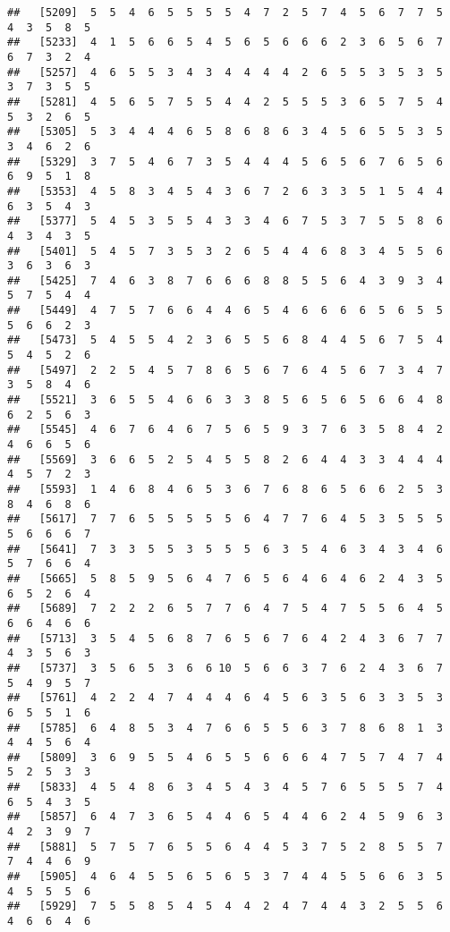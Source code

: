 \documentclass[
]{book}
\begin{document}
\begin{verbatim}
##   [5209]  5  5  4  6  5  5  5  5  4  7  2  5  7  4  5  6  7  7  5  4  3  5  8  5
##   [5233]  4  1  5  6  6  5  4  5  6  5  6  6  6  2  3  6  5  6  7  6  7  3  2  4
##   [5257]  4  6  5  5  3  4  3  4  4  4  4  2  6  5  5  3  5  3  5  3  7  3  5  5
##   [5281]  4  5  6  5  7  5  5  4  4  2  5  5  5  3  6  5  7  5  4  5  3  2  6  5
##   [5305]  5  3  4  4  4  6  5  8  6  8  6  3  4  5  6  5  5  3  5  3  4  6  2  6
##   [5329]  3  7  5  4  6  7  3  5  4  4  4  5  6  5  6  7  6  5  6  6  9  5  1  8
##   [5353]  4  5  8  3  4  5  4  3  6  7  2  6  3  3  5  1  5  4  4  6  3  5  4  3
##   [5377]  5  4  5  3  5  5  4  3  3  4  6  7  5  3  7  5  5  8  6  4  3  4  3  5
##   [5401]  5  4  5  7  3  5  3  2  6  5  4  4  6  8  3  4  5  5  6  3  6  3  6  3
##   [5425]  7  4  6  3  8  7  6  6  6  8  8  5  5  6  4  3  9  3  4  5  7  5  4  4
##   [5449]  4  7  5  7  6  6  4  4  6  5  4  6  6  6  6  5  6  5  5  5  6  6  2  3
##   [5473]  5  4  5  5  4  2  3  6  5  5  6  8  4  4  5  6  7  5  4  5  4  5  2  6
##   [5497]  2  2  5  4  5  7  8  6  5  6  7  6  4  5  6  7  3  4  7  3  5  8  4  6
##   [5521]  3  6  5  5  4  6  6  3  3  8  5  6  5  6  5  6  6  4  8  6  2  5  6  3
##   [5545]  4  6  7  6  4  6  7  5  6  5  9  3  7  6  3  5  8  4  2  4  6  6  5  6
##   [5569]  3  6  6  5  2  5  4  5  5  8  2  6  4  4  3  3  4  4  4  4  5  7  2  3
##   [5593]  1  4  6  8  4  6  5  3  6  7  6  8  6  5  6  6  2  5  3  8  4  6  8  6
##   [5617]  7  7  6  5  5  5  5  5  6  4  7  7  6  4  5  3  5  5  5  5  6  6  6  7
##   [5641]  7  3  3  5  5  3  5  5  5  6  3  5  4  6  3  4  3  4  6  5  7  6  6  4
##   [5665]  5  8  5  9  5  6  4  7  6  5  6  4  6  4  6  2  4  3  5  6  5  2  6  4
##   [5689]  7  2  2  2  6  5  7  7  6  4  7  5  4  7  5  5  6  4  5  6  6  4  6  6
##   [5713]  3  5  4  5  6  8  7  6  5  6  7  6  4  2  4  3  6  7  7  4  3  5  6  3
##   [5737]  3  5  6  5  3  6  6 10  5  6  6  3  7  6  2  4  3  6  7  5  4  9  5  7
##   [5761]  4  2  2  4  7  4  4  4  6  4  5  6  3  5  6  3  3  5  3  6  5  5  1  6
##   [5785]  6  4  8  5  3  4  7  6  6  5  5  6  3  7  8  6  8  1  3  4  4  5  6  4
##   [5809]  3  6  9  5  5  4  6  5  5  6  6  6  4  7  5  7  4  7  4  5  2  5  3  3
##   [5833]  4  5  4  8  6  3  4  5  4  3  4  5  7  6  5  5  5  7  4  6  5  4  3  5
##   [5857]  6  4  7  3  6  5  4  4  6  5  4  4  6  2  4  5  9  6  3  4  2  3  9  7
##   [5881]  5  7  5  7  6  5  5  6  4  4  5  3  7  5  2  8  5  5  7  7  4  4  6  9
##   [5905]  4  6  4  5  5  6  5  6  5  3  7  4  4  5  5  6  6  3  5  4  5  5  5  6
##   [5929]  7  5  5  8  5  4  5  4  4  2  4  7  4  4  3  2  5  5  6  4  6  6  4  6

\end{verbatim}
\end{document}

